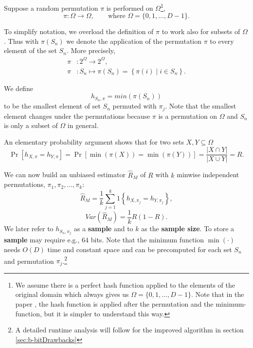 \documentclass[a4paper]{article}
\begin{document}
Suppose a random permutation $\pi$ is performed on $\Omega$\footnote{We assume there is a perfect hash function applied to the elements of the original domain which always gives us $\Omega = \{0,1,\ldots,D-1\}$. Note that in the paper \citep{LiK11}, the hash function is applied after the permutation and the minimum-function, but it is simpler to understand this way.},
\[
\pi:\Omega \longrightarrow \Omega, \qquad \text{where } \Omega = \{0,1,\ldots,D-1\}.
\]

To simplify notation, we overload the definition of $\pi$ to work also for subsets of $\Omega$. Thus with $\pi(S_n)$ we denote the application of the permutation $\pi$ to every element of the set $S_n$. More precisely,
\begin{equation*}
\begin{split}
\pi &: 2^\Omega \longrightarrow 2^\Omega, \\
\pi &: S_n \longmapsto \pi \left( S_n \right) = \left\lbrace \pi \left( i \right) \middle\vert i \in S_n \right\rbrace. 
\end{split}
\end{equation*}

We define
\[
h_{S_n,\pi}=min(\pi(S_n))
\]
to be the smallest element of set $S_n$ permuted with $\pi_j$. Note that the smallest element changes under the permutations because $\pi$ is a permutation on $\Omega$ and $S_n$ is only a subset of $\Omega$ in general.

An elementary probability argument shows that for two sets $X,Y \subseteq \Omega$
\begin{equation}\label{eq:minwiseOri}
\Pr[h_{X,\pi}=h_{Y,\pi}]=\Pr [\min(\pi(X))=\min(\pi(Y))]=\frac{\left| X \cap Y \right|}{\left| X \cup Y \right|}=R.
\end{equation}

We can now build an unbiased estimator $\hat{R}_M$ of $R$ with $k$ minwise independent permutations, $\pi_1,\pi_2,\ldots,\pi_k$:
\begin{equation}
\hat{R}_M=\frac{1}{k}\sum_{j=1}^k 1 \left\lbrace h_{X,\pi_j}=h_{Y,\pi_j} \right\rbrace,
\end{equation}
\begin{equation}\label{eq:minWiseVariance}
Var(\hat{R}_M)=\frac{1}{k}R(1-R).
\end{equation}
We later refer to $h_{S_n,\pi_j}$ as a \textbf{sample} and to $k$ as the \textbf{sample size}. To store a \textbf{sample} may require e.g., $64$ bits. Note that the minimum function $\min(\cdot)$ needs $O(D)$ time and constant space and can be precomputed for each set $S_n$ and permutation $\pi_j$.\footnote{A detailed runtime analysis will follow for the improved algorithm in section \vref{sec:b-bitDrawbacks}}
\end{document}
